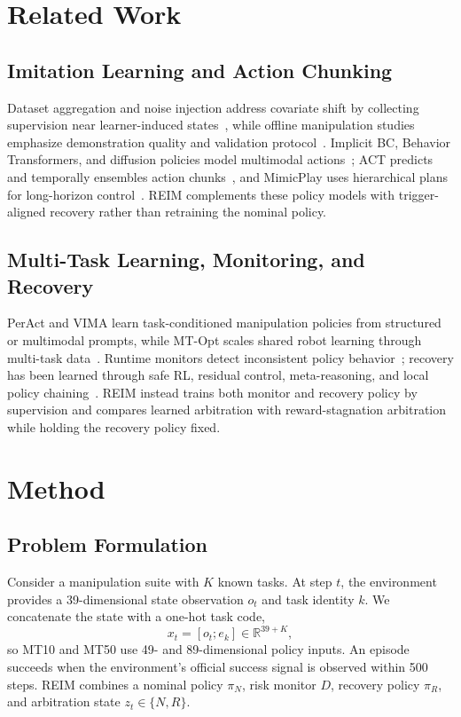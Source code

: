 \documentclass[conference]{IEEEtran}
\begin{document}
\section{Related Work}
\label{sec:related}

\subsection{Imitation Learning and Action Chunking}
Dataset aggregation and noise injection address covariate shift by collecting supervision near learner-induced states~\cite{ross2011dagger,laskey2017dart}, while offline manipulation studies emphasize demonstration quality and validation protocol~\cite{mandlekar2022robomimic}. Implicit BC, Behavior Transformers, and diffusion policies model multimodal actions~\cite{florence2022ibc,shafiullah2022bet,chi2023diffusion}; ACT predicts and temporally ensembles action chunks~\cite{zhao2023act}, and MimicPlay uses hierarchical plans for long-horizon control~\cite{wang2023mimicplay}. REIM complements these policy models with trigger-aligned recovery rather than retraining the nominal policy.

\subsection{Multi-Task Learning, Monitoring, and Recovery}
PerAct and VIMA learn task-conditioned manipulation policies from structured or multimodal prompts, while MT-Opt scales shared robot learning through multi-task data~\cite{shridhar2023peract,jiang2023vima,kalashnikov2021mtopt}. Runtime monitors detect inconsistent policy behavior~\cite{agia2025sentinel}; recovery has been learned through safe RL, residual control, meta-reasoning, and local policy chaining~\cite{thananjeyan2021recovery,johannink2019residual,vats2023metareskill,vats2024recoverychaining}. REIM instead trains both monitor and recovery policy by supervision and compares learned arbitration with reward-stagnation arbitration while holding the recovery policy fixed.

\section{Method}
\label{sec:method}

\subsection{Problem Formulation}
Consider a manipulation suite with $K$ known tasks. At step $t$, the environment provides a 39-dimensional state observation $o_t$ and task identity $k$. We concatenate the state with a one-hot task code,
\begin{equation}
  x_t=[o_t; e_k]\in\mathbb{R}^{39+K},
\end{equation}
so MT10 and MT50 use 49- and 89-dimensional policy inputs. An episode succeeds when the environment's official success signal is observed within 500 steps. REIM combines a nominal policy $\pi_N$, risk monitor $D$, recovery policy $\pi_R$, and arbitration state $z_t\in\{N,R\}$.
\end{document}
